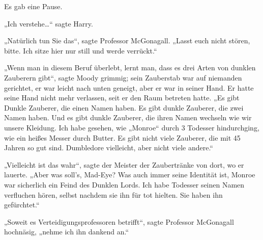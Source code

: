 Es gab eine Pause.

„Ich verstehe…“ sagte Harry.

„Natürlich tun Sie das“, sagte Professor McGonagall. „Lasst euch nicht stören, bitte. Ich sitze hier nur still und werde verrückt.“

„Wenn man in diesem Beruf überlebt, lernt man, dass es drei Arten von dunklen Zauberern gibt“, sagte Moody grimmig; sein Zauberstab war auf niemanden gerichtet, er war leicht nach unten geneigt, aber er war in seiner Hand. Er hatte seine Hand nicht mehr verlassen, seit er den Raum betreten hatte. „Es gibt Dunkle Zauberer, die einen Namen haben. Es gibt dunkle Zauberer, die zwei Namen haben. Und es gibt dunkle Zauberer, die ihren Namen wechseln wie wir unsere Kleidung. Ich habe gesehen, wie „Monroe“ durch 3 Todesser hindurchging, wie ein heißes Messer durch Butter. Es gibt nicht viele Zauberer, die mit 45 Jahren so gut sind. Dumbledore vielleicht, aber nicht viele andere.“

„Vielleicht ist das wahr“, sagte der Meister der Zaubertränke von dort, wo er lauerte. „Aber was soll’s, Mad-Eye? Was auch immer seine Identität ist, Monroe war sicherlich ein Feind des Dunklen Lords. Ich habe Todesser seinen Namen verfluchen hören, selbst nachdem sie ihn für tot hielten. Sie haben ihn gefürchtet.“

„Soweit es Verteidigungsprofessoren betrifft“, sagte Professor McGonagall hochnäsig, „nehme ich ihn dankend an.“

